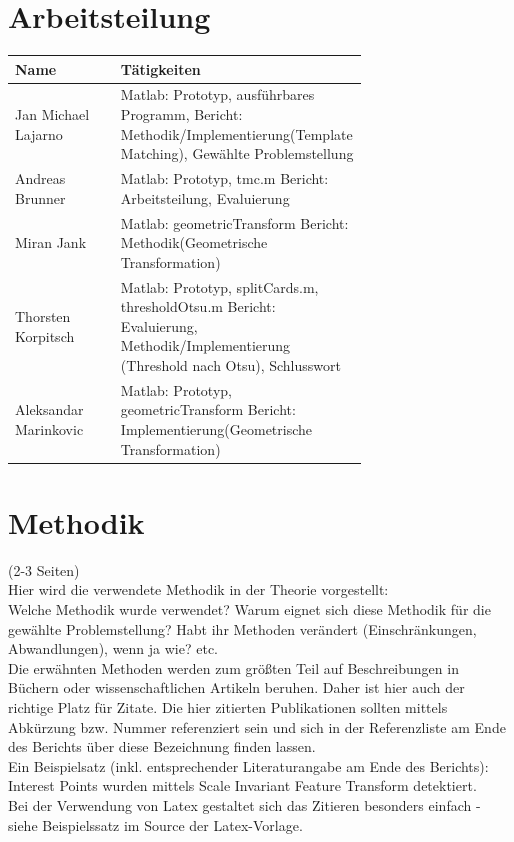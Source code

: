 \documentclass[paper=A4, deutsch]{scrartcl}
\begin{document}
\section{Arbeitsteilung}
\begin{center}
  \begin{tabular}{ |l |p{0.7\linewidth} | }
    \hline
  Name & Tätigkeiten\\
    \hline
		Jan Michael Lajarno & Matlab: Prototyp, ausführbares Programm, \newline Bericht: Methodik/Implementierung(Template Matching), Gewählte Problemstellung\\
		\hline
		Andreas Brunner & Matlab: Prototyp, tmc.m \newline Bericht: Arbeitsteilung, Evaluierung\\
		\hline
		Miran Jank & Matlab: geometricTransform \newline Bericht: Methodik(Geometrische Transformation)\\
		\hline
		Thorsten Korpitsch & Matlab: Prototyp, splitCards.m, thresholdOtsu.m \newline Bericht: Evaluierung, Methodik/Implementierung (Threshold nach Otsu), Schlusswort\\
		\hline
		Aleksandar Marinkovic & Matlab: Prototyp, geometricTransform \newline Bericht: Implementierung(Geometrische Transformation)\\ 
		\hline
  \end{tabular}
\end{center}


\section{Methodik}
(2-3 Seiten)\\
Hier wird die verwendete Methodik in der Theorie vorgestellt:\\
Welche Methodik wurde verwendet? Warum eignet sich diese Methodik für die gewählte Problemstellung? Habt ihr Methoden verändert (Einschränkungen, Abwandlungen), wenn ja wie? etc.\\
Die erwähnten Methoden werden zum größten Teil auf Beschreibungen in Büchern oder wissenschaftlichen Artikeln beruhen. Daher ist hier auch der richtige Platz für Zitate. Die hier zitierten Publikationen sollten mittels Abkürzung bzw. Nummer referenziert sein und sich in der Referenzliste am Ende des Berichts über diese Bezeichnung finden lassen.\\
Ein Beispielsatz (inkl. entsprechender Literaturangabe am Ende des Berichts): Interest Points wurden mittels Scale Invariant Feature Transform detektiert.\\
Bei der Verwendung von Latex gestaltet sich das Zitieren besonders einfach - siehe Beispielssatz im Source der Latex-Vorlage.\\
\end{document}
